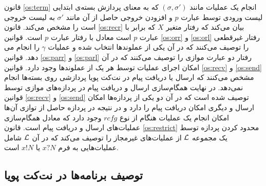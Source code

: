قانون 
\ref{os:term}
انجام یک عملیات مانند
$(\sigma,\sigma')$
که به معنای
پردازش بسته‌ی ابتدایی لیست ورودی توسط عبارت 
$p$
و افزودن خروجی حاصل از آن مانند 
$\sigma'$
به لیست خروجی است را مشخص می‌کند.
قانون 
\ref{os:recr}
بیان می‌کند که رفتار متغیر 
$X$
که برابر با عبارت 
$p$
است معادل با رفتار عبارت 
$p$
است.
قوانین 
\ref{os:orr}
و
\ref{os:orl}
رفتار غیرقطعی را توصیف می‌کنند که در آن یکی از عملوند‌ها انتخاب شده و عملیات 
$\gamma$
را انجام می دهد.
قوانین
\ref{os:parr}
و
\ref{os:parl}
رفتار دو عبارت موازی را توصیف می‌کنند که در آن امکان اجرای عملیات توسط هر یک از عملوندها وجود دارد.
قوانین
\ref{os:recv}
و
\ref{os:send}
مشخص می‌کنند که ارسال یا دریافت پیام در نت‌کت پویا پردازشی روی بسته‌ها انجام نمی‌دهد.
در نهایت همگام‌سازی%
ارسال و دریافت پیام در پردازه‌های موازی توسط قوانین 
\ref{os:recv}
و
\ref{os:send}
توصیف شده است که در آن دو یکی از پردازه‌ها امکان ارسال و دیگری امکان دریافت پیام را دارد و در نتیجه در پردازه‌ حاصل از توازی آن‌ها امکان انجام یک عملیات هنگام از نوع 
$rcfg$
وجود دارد که معادل همگام‌سازی عملیات‌های ارسال و دریافت پیام است.
قانون
\ref{os:restrict}
محدود کردن پردازه توسط یک مجموعه 
$\mathcal{L}$
از عملیات‌های غیرمجاز را توصیف می‌کند که در آن
$\mathcal{L}$
شامل عملیات‌هایی به فرم 
$x?N$
یا
$x!N$
است. 

\subsection{توصیف برنامه‌ها در نت‌کت پویا}

